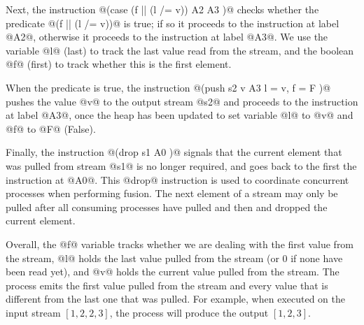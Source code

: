 Next, the instruction @(case (f || (l /= v)) A2 {} A3 {})@ checks whether the predicate @(f || (l /= v))@ is true; if so it proceeds to the instruction at label @A2@, otherwise it proceeds to the instruction at label @A3@.
We use the variable @l@ (last) to track the last value read from the stream, and the boolean @f@ (first) to track whether this is the first element.

When the predicate is true, the instruction @(push s2 v A3 { l = v, f = F })@ pushes the value @v@ to the output stream @s2@ and proceeds to the instruction at label @A3@, once the heap has been updated to set variable @l@ to @v@ and @f@ to @F@ (False). 

Finally, the instruction @(drop s1 A0 {})@ signals that the current element that was pulled from stream @s1@ is no longer required, and goes back to the first the instruction at @A0@. This @drop@ instruction is used to coordinate concurrent processes when performing fusion. The next element of a stream may only be pulled after all consuming processes have pulled and then and dropped the current element.

Overall, the @f@ variable tracks whether we are dealing with the first value from the stream, @l@ holds the last value pulled from the stream (or 0 if none have been read yet), and @v@ holds the current value pulled from the stream. The process emits the first value pulled from the stream and every value that is different from the last one that was pulled. For example, when executed on the input stream $[1, 2, 2, 3]$, the process will produce the output $[1, 2, 3]$.

